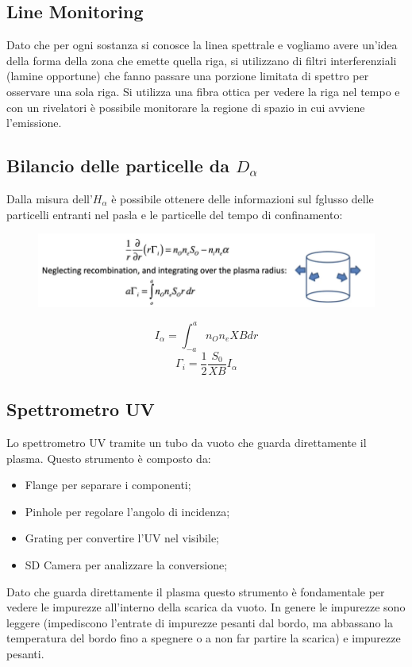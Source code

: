 \documentclass{article}
\begin{document}
\subsection{Line Monitoring}
Dato che per ogni sostanza si conosce la linea spettrale e vogliamo avere un'idea della forma della zona che emette quella riga, si utilizzano di filtri interferenziali (lamine opportune) che fanno passare una porzione limitata di spettro per osservare una sola riga. Si utilizza una fibra ottica per vedere la riga nel tempo e con un rivelatori è possibile monitorare la regione di spazio in cui avviene l'emissione.
\subsection{Bilancio delle particelle da \(D_{\alpha } \)}
Dalla misura dell'\(H_{\alpha}\) è possibile ottenere delle informazioni sul fglusso delle particelli entranti nel pasla e le particelle del tempo di confinamento:
\begin{figure}
    \includegraphics[scale=0.4]{2022-06-22-11-18-56.png}%
\end{figure}
\begin{equation*}
    I_{\alpha}=\int_{-a}^{a}n_{O}n_{e}X B dr
\end{equation*}
\begin{equation*}
    \Gamma_{i}=\frac{1}{2}\frac{S_{0}}{X B}I_{\alpha}
\end{equation*}
\subsection{Spettrometro UV}
Lo spettrometro UV tramite un tubo da vuoto che guarda direttamente il plasma. Questo strumento è composto da:\begin{itemize}
    \item Flange per separare i componenti;
    \item Pinhole per regolare l'angolo di incidenza;
    \item Grating per convertire l'UV nel visibile;
    \item SD Camera per analizzare la conversione;
\end{itemize}
Dato che guarda direttamente il plasma questo strumento è fondamentale per vedere le impurezze all'interno della scarica da vuoto. In genere le impurezze sono leggere (impediscono l'entrate di impurezze pesanti dal bordo, ma abbassano la temperatura del bordo fino a spegnere o a non far partire la scarica) e impurezze pesanti.
\end{document}
